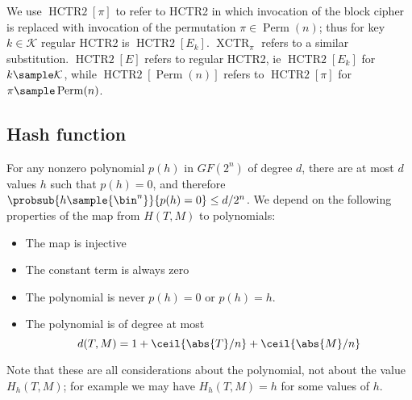 \documentclass[letterpaper,11pt]{article}
\DeclareMathOperator{\HCTR}{HCTR2}
\DeclareMathOperator{\Perm}{Perm}
\DeclareMathOperator{\XCTR}{XCTR}
\begin{document}
We use \(\HCTR[\pi]\) to refer to HCTR2 in which invocation
of the block cipher is replaced with invocation of the
permutation \(\pi \in \Perm(n)\); thus for key
\(k \in \mathcal{K}\) regular HCTR2 is \(\HCTR[E_k]\).
\(\XCTR_\pi\) refers to a similar substitution.
\(\HCTR[E]\) refers to regular HCTR2,
ie \(\HCTR[E_k]\) for \(k \sample \mathcal{K}\), while
\(\HCTR[\Perm(n)]\) refers to \(\HCTR[\pi]\)
for \(\pi \sample \Perm(n)\).

\subsection{Hash function}\label{hproperties}
For any nonzero polynomial \(p(h)\)
in \(GF(2^n)\) 
of degree \(d\), there are at most \(d\) values \(h\)
such that \(p(h) = 0\), and therefore
\(\probsub{h\sample{\bin^n}}{p(h) = 0} \leq d/2^n\).
We depend on the following properties of the map from 
\(H(T, M)\) to polynomials:
\begin{itemize}
    \item The map is injective
    \item The constant term is always zero
    \item The polynomial is never \(p(h) = 0\) or \(p(h) = h\).
    \item The polynomial is of degree at most
    \begin{displaymath}
        d(T, M) = 1 + \ceil{\abs{T}/n} + \ceil{\abs{M}/n}
    \end{displaymath}
\end{itemize}
Note that these are all considerations about the polynomial,
not about the value \(H_h(T, M)\);
for example we may have \(H_h(T, M) = h\) for some values of \(h\).
\end{document}
